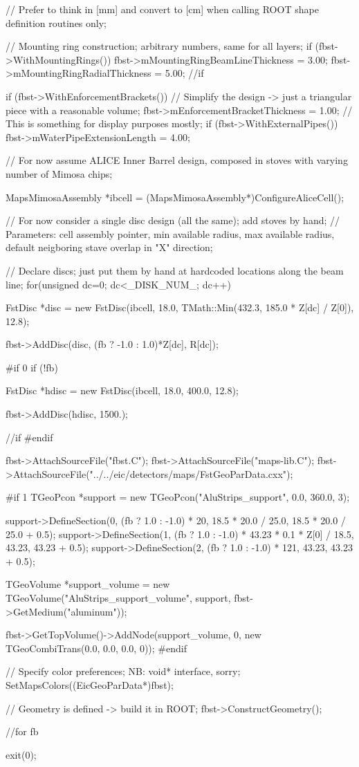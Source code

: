 \documentclass[12pt]{article}
\begin{document}
\begin{tcolorbox}
\begin{verbnobox}[\tiny]
{{    // Prefer to think in [mm] and convert to [cm] when calling ROOT shape definition routines only;

    // Mounting ring construction; arbitrary numbers, same for all layers;
    if (fbst->WithMountingRings()) {
      fbst->mMountingRingBeamLineThickness =    3.00;
      fbst->mMountingRingRadialThickness   =    5.00;
    } //if
   
    if (fbst->WithEnforcementBrackets()) // Simplify the design -> just a triangular piece with a reasonable volume; 
      fbst->mEnforcementBracketThickness   =    1.00;
    // This is something for display purposes mostly;
    if (fbst->WithExternalPipes())
      fbst->mWaterPipeExtensionLength      =    4.00;

    //  For now assume ALICE Inner Barrel design, composed in stoves with varying number of Mimosa chips;

    MapsMimosaAssembly *ibcell = (MapsMimosaAssembly*)ConfigureAliceCell();

    // For now consider a single disc design (all the same); add stoves by hand;
    // Parameters: cell assembly pointer, min available radius, max available radius, default neigboring stave overlap in "X" direction;

    // Declare discs; just put them by hand at hardcoded locations along the beam line;
    for(unsigned dc=0; dc<_DISK_NUM_; dc++) {
      FstDisc *disc = new FstDisc(ibcell, 18.0, TMath::Min(432.3, 185.0 * Z[dc] / Z[0]), 12.8);

      fbst->AddDisc(disc, (fb ? -1.0 : 1.0)*Z[dc], R[dc]);
    }
#if 0
    if (!fb) {
      FstDisc *hdisc = new FstDisc(ibcell, 18.0, 400.0, 12.8);

      fbst->AddDisc(hdisc, 1500.);
    } //if
#endif

    fbst->AttachSourceFile("fbst.C");
    fbst->AttachSourceFile("maps-lib.C");
    fbst->AttachSourceFile("../../eic/detectors/maps/FstGeoParData.cxx");

#if 1
    TGeoPcon *support = new TGeoPcon("AluStrips_support", 0.0, 360.0, 3);

    support->DefineSection(0, (fb ? 1.0 : -1.0) * 20, 18.5 * 20.0 / 25.0, 18.5 * 20.0 / 25.0 + 0.5);
    support->DefineSection(1, (fb ? 1.0 : -1.0) * 43.23 * 0.1 * Z[0] / 18.5, 43.23, 43.23 + 0.5);
    support->DefineSection(2, (fb ? 1.0 : -1.0) * 121, 43.23, 43.23 + 0.5);

    TGeoVolume *support_volume = new TGeoVolume("AluStrips_support_volume", support, fbst->GetMedium("aluminum"));

    fbst->GetTopVolume()->AddNode(support_volume, 0, new TGeoCombiTrans(0.0, 0.0, 0.0, 0));
#endif

    // Specify color preferences; NB: void* interface, sorry;
    SetMapsColors((EicGeoParData*)fbst);

    // Geometry is defined -> build it in ROOT;
    fbst->ConstructGeometry();
  } //for fb
  
  exit(0);
}
\end{verbnobox}  
\end{tcolorbox}
\end{document}
